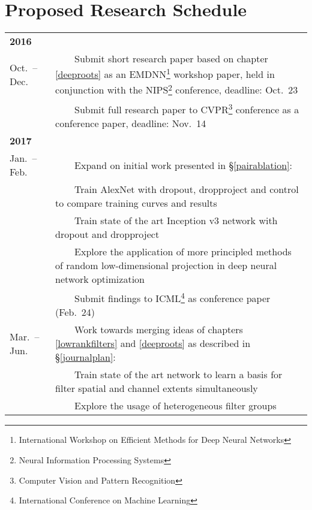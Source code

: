 \documentclass[thesis]{subfiles}
\begin{document}
\section{Proposed Research Schedule}

\newcommand{\tabitem}{~~\llap{\textbullet}~~}
\newcommand{\tabtabitem}{~~\llap{\textendash}~~}
\begin{tabularx}{\textwidth}{lX}
\multicolumn{2}{l}{\textbf{2016}}\\ \cline{1-2}
Oct.\ -- Dec. & \tabitem Submit short research paper based on chapter \ref{deeproots} as an EMDNN\footnote{International Workshop on Efficient Methods for Deep Neural Networks} workshop paper, held in conjunction with the NIPS\footnote{Neural Information Processing Systems} conference, deadline: Oct.\ 23\\
& \tabitem Submit full research paper to CVPR\footnote{Computer Vision and Pattern Recognition} conference as a conference paper, deadline: Nov.\ 14\\
\multicolumn{2}{l}{\textbf{2017}}\\ \cline{1-2}
Jan.\ -- Feb.& \tabitem Expand on initial work presented in \S\ref{pairablation}:\\
& \tabtabitem Train AlexNet with dropout, dropproject and control to compare training curves and results\\
& \tabtabitem Train state of the art Inception v3 network with dropout and dropproject\\
& \tabtabitem Explore the application of more principled methods of random low-dimensional projection in deep neural network optimization\\
& \tabitem Submit findings to ICML\footnote{International Conference on Machine Learning} as conference paper (Feb.\ 24)\\
Mar.\ -- Jun.& \tabitem Work towards merging ideas of chapters \ref{lowrankfilters} and \ref{deeproots} as described in \S\ref{journalplan}:\\
& \tabtabitem Train state of the art network to learn a basis for filter spatial and channel extents simultaneously\\
& \tabtabitem Explore the usage of heterogeneous filter groups\\

\end{tabularx}
\end{document}
